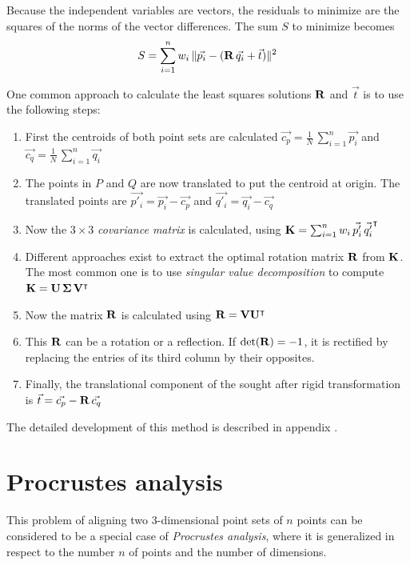 Because the independent variables are vectors, the residuals to minimize are the squares of the norms of the vector differences. The sum $S$ to minimize becomes
\begin{equation}
S = \sum_{i=1}^{n} w_i \, \| \vec{p_i} - (\mathbf{R} \, \vec{q_i} + \vec{t}) \|^2
\end{equation}

One common approach to calculate the least squares solutions $\mathbf{R}$ and $\vec{t}$ is to use the following steps:
\begin{enumerate}
\item First the centroids of both point sets are calculated $\vec{c_p} = \frac{1}{N} \, \sum_{i=1}^{n} \vec{p_i}$ and $\vec{c_q} = \frac{1}{N} \, \sum_{i=1}^{n} \vec{q_i}$
\item The points in $P$ and $Q$ are now translated to put the centroid at origin. The translated points are $\vec{p'_i} = \vec{p_i} - \vec{c_p}$ and $\vec{q'_i} = \vec{q_i} - \vec{c_q}$
\item Now the $3 \times 3$ \emph{covariance matrix} is calculated, using $\mathbf{K} = \sum_{i=1}^{n} w_i \, \vec{p'_i} \, \vec{q'_i}^\intercal$
\item Different approaches exist to extract the optimal rotation matrix $\mathbf{R}$ from $\mathbf{K}$. The most common one is to use \emph{singular value decomposition} to compute $\mathbf{K} = \mathbf{U} \, \mathbf{\Sigma} \, \mathbf{V}^\intercal$
\item Now the matrix $\mathbf{R}$ is calculated using $\mathbf{R} = \mathbf{V} \mathbf{U}^\intercal$
\item This $\mathbf{R}$ can be a rotation or a reflection. If $\det(\mathbf{R}) = -1$, it is rectified by replacing the entries of its third column by their opposites.
\item Finally, the translational component of the sought after rigid transformation is $\vec{t} = \vec{c_p} - \mathbf{R} \, \vec{c_q}$
\end{enumerate}

The detailed development of this method is described in appendix \label{sec:lsq_align}.

\section{Procrustes analysis} \label{sec:procrustes}
This problem of aligning two $3$-dimensional point sets of $n$ points can be considered to be a special case of \emph{Procrustes analysis}, where it is generalized in respect to the number $n$ of points and the number of dimensions.

